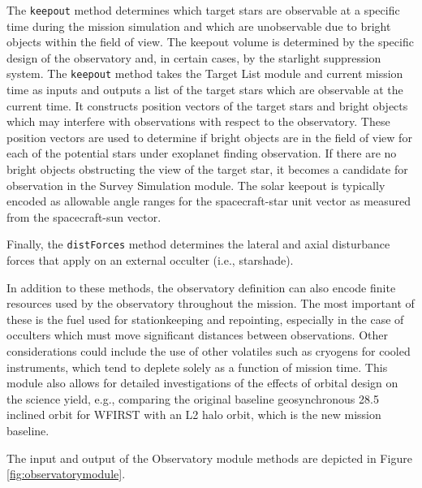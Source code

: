 \documentclass[cleanfoot]{asme2ej}
\newcommand{\reffig}[1]{Figure \ref{#1}}
\begin{document}
The \verb+keepout+ method determines which target stars are observable at a specific time during the mission simulation and which are unobservable due to bright objects within the field of view. The keepout volume is determined by the specific design of the observatory and, in certain cases, by the starlight suppression system.  The \verb+keepout+ method takes the Target List module and current mission time as inputs and outputs a list of the target stars which are observable at the current time. It constructs position vectors of the target stars and bright objects which may interfere with observations with respect to the observatory. These position vectors are used to determine if bright objects are in the field of view for each of the potential stars under exoplanet finding observation.  If there are no bright objects obstructing the view of the target star, it becomes a candidate for observation in the Survey Simulation module.  The solar keepout is typically encoded as allowable angle ranges for the spacecraft-star unit vector as measured from the spacecraft-sun vector.



Finally, the \verb+distForces+ method determines the lateral and axial disturbance forces that apply on an external occulter (i.e., starshade).

In addition to these methods, the observatory definition can also encode finite resources used by the observatory throughout the mission.  The most important of these is the fuel used for stationkeeping and repointing, especially in the case of occulters which must move significant distances between observations.  Other considerations could include the use of other volatiles such as cryogens for cooled instruments, which tend to deplete solely as a function of mission time.  This module also allows for detailed investigations of the effects of orbital design on the science yield, e.g., comparing the original baseline geosynchronous 28.5\textdegree{} inclined orbit for WFIRST with an L2 halo orbit, which is the new mission baseline. 

The input and output of the Observatory module methods are depicted in \reffig{fig:observatorymodule}.

\end{document}
